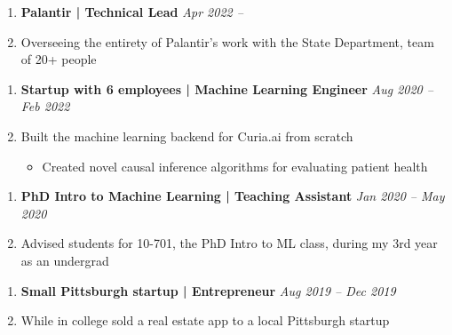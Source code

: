 \documentclass[letterpaper,11pt]{article}
\newcommand{\resitem}[1]{\item #1 \vspace{-2pt}}
\begin{document}
\begin{enumerate}[leftmargin=10pt]
	\item[] \textbf{\Large Palantir | \textcolor{myBlue}{Technical Lead}}  \cftdotfill{\cftdotsep} \large \textit{\textcolor{myBlue}{Apr 2022 --}}\\
	\item[] \large Overseeing the entirety of Palantir's work with the State Department, team of 20+ people
\end{enumerate}

\begin{enumerate}[leftmargin=10pt]
	\item[] \textbf{\Large Startup with 6 employees | \textcolor{myBlue}{Machine Learning Engineer}}  \cftdotfill{\cftdotsep} \large \textit{\textcolor{myBlue}{Aug 2020 --} Feb 2022}\\
	\item[] \large Built the machine learning backend for Curia.ai from scratch
	\begin{itemize}
		\resitem{Created novel causal inference algorithms for evaluating patient health}
	\end{itemize}
\end{enumerate}

\begin{enumerate}[leftmargin=10pt]
	\item[] \textbf{\Large PhD Intro to Machine Learning | \textcolor{myBlue}{Teaching Assistant}}  \cftdotfill{\cftdotsep} \large \textit{\textcolor{myBlue}{Jan 2020 --} May 2020}\\
	\item[] \large Advised students for 10-701, the PhD Intro to ML class, during my 3rd year as an undergrad
\end{enumerate}

\begin{enumerate}[leftmargin=10pt]
	\item[] \textbf{\Large Small Pittsburgh startup | \textcolor{myBlue}{Entrepreneur}}  \cftdotfill{\cftdotsep} \large \textit{\textcolor{myBlue}{Aug 2019 --} Dec 2019}\\
	\item[] \large While in college sold a real estate app to a local Pittsburgh startup
\end{enumerate}
\end{document}
